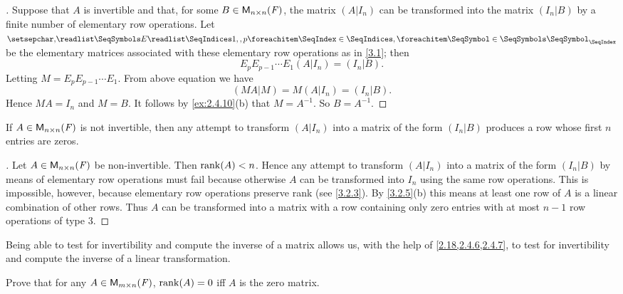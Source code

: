 \begin{proof}[]
	Suppose that \(A\) is invertible and that, for some \(B \in \ms[n][n][\F]\), the matrix \((A | I_n)\) can be transformed into the matrix \((I_n | B)\) by a finite number of elementary row operations.
	Let \(\seq{E}{1,,p}\) be the elementary matrices associated with these elementary row operations as in \cref{3.1};
	then
	\[
		E_p E_{p - 1} \cdots E_1 (A | I_n) = (I_n | B).
	\]
	Letting \(M = E_p E_{p - 1} \cdots E_1\).
	From above equation we have
	\[
		(MA | M) = M (A | I_n) = (I_n | B).
	\]
	Hence \(MA = I_n\) and \(M = B\).
	It follows by \cref{ex:2.4.10}(b) that \(M = A^{-1}\).
	So \(B = A^{-1}\).
\end{proof}

\begin{cor}\label{3.2.10}
	If \(A \in \ms[n][n][\F]\) is not invertible, then any attempt to transform \((A | I_n)\) into a matrix of the form \((I_n | B)\) produces a row whose first \(n\) entries are zeros.
\end{cor}

\begin{proof}[]
	Let \(A \in \ms[n][n][\F]\) be non-invertible.
	Then \(\rk{A} < n\).
	Hence any attempt to transform \((A | I_n)\) into a matrix of the form \((I_n | B)\) by means of elementary row operations must fail because otherwise \(A\) can be transformed into \(I_n\) using the same row operations.
	This is impossible, however, because elementary row operations preserve rank
	(see \cref{3.2.3}).
	By \cref{3.2.5}(b) this means at least one row of \(A\) is a linear combination of other rows.
	Thus \(A\) can be transformed into a matrix with a row containing only zero entries with at most \(n - 1\) row operations of type 3.
\end{proof}

\begin{note}
	Being able to test for invertibility and compute the inverse of a matrix allows us, with the help of \cref{2.18,2.4.6,2.4.7}, to test for invertibility and compute the inverse of a linear transformation.
\end{note}

\exercisesection

\setcounter{ex}{2}
\begin{ex}\label{ex:3.2.3}
	Prove that for any \(A \in \MS\), \(\rk{A} = 0\) iff \(A\) is the zero matrix.
\end{ex}

